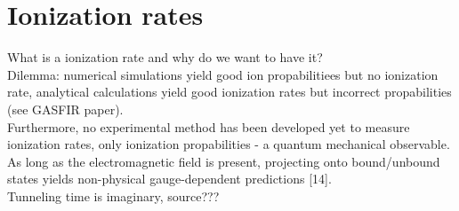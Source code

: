 \section{Ionization rates}
What is a ionization rate and why do we want to have it?\\
Dilemma: numerical simulations yield good ion propabilitiees but no ionization rate, analytical calculations yield good ionization rates but incorrect propabilities (see GASFIR paper).\\
Furthermore, no experimental method has been developed yet to measure ionization rates, only ionization propabilities - a quantum mechanical observable.\\
As long as the electromagnetic
field is present, projecting onto bound/unbound states
yields non-physical gauge-dependent predictions [14].\\       %
Tunneling time is imaginary, source???\\











